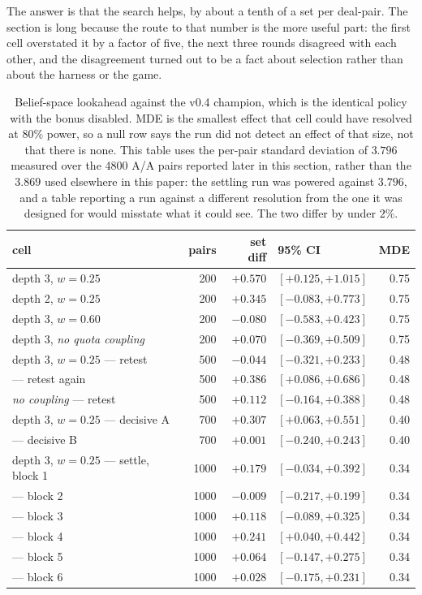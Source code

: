 \documentclass[11pt,a4paper]{article}
\begin{document}
The answer is that the search helps, by about a tenth of a set per deal-pair.
The section is long because the route to that number is the more useful part:
the first cell overstated it by a factor of five, the next three rounds
disagreed with each other, and the disagreement turned out to be a fact about
selection rather than about the harness or the game.

\begin{table}[t]
\centering
\small
\begin{tabular}{lrrlr}
\toprule
cell & pairs & set diff & 95\% CI & MDE \\
\midrule
depth 3, $w=0.25$ & 200 & $\mathbf{+0.570}$ & $[+0.125, +1.015]$ & 0.75 \\
depth 2, $w=0.25$ & 200 & $+0.345$ & $[-0.083, +0.773]$ & 0.75 \\
depth 3, $w=0.60$ & 200 & $-0.080$ & $[-0.583, +0.423]$ & 0.75 \\
depth 3, \emph{no quota coupling} & 200 & $+0.070$ & $[-0.369, +0.509]$ & 0.75 \\
\midrule
depth 3, $w=0.25$ --- retest & 500 & $-0.044$ & $[-0.321, +0.233]$ & 0.48 \\
\midrule
\quad --- retest again & 500 & $\mathbf{+0.386}$ & $[+0.086, +0.686]$ & 0.48 \\
\midrule
\emph{no coupling} --- retest & 500 & $+0.112$ & $[-0.164, +0.388]$ & 0.48 \\
\midrule
depth 3, $w=0.25$ --- decisive A & 700 & $\mathbf{+0.307}$ & $[+0.063, +0.551]$ & 0.40 \\
\midrule
\quad --- decisive B & 700 & $+0.001$ & $[-0.240, +0.243]$ & 0.40 \\
depth 3, $w=0.25$ --- settle, block 1 & 1000 & $+0.179$ & $[-0.034, +0.392]$ & 0.34 \\
\quad --- block 2 & 1000 & $-0.009$ & $[-0.217, +0.199]$ & 0.34 \\
\quad --- block 3 & 1000 & $+0.118$ & $[-0.089, +0.325]$ & 0.34 \\
\quad --- block 4 & 1000 & $\mathbf{+0.241}$ & $[+0.040, +0.442]$ & 0.34 \\
\quad --- block 5 & 1000 & $+0.064$ & $[-0.147, +0.275]$ & 0.34 \\
\quad --- block 6 & 1000 & $+0.028$ & $[-0.175, +0.231]$ & 0.34 \\
\bottomrule
\end{tabular}
\caption{Belief-space lookahead against the v0.4 champion, which is the identical policy with the bonus disabled. MDE is the smallest effect that cell could have resolved at 80\% power, so a null row says the run did not detect an effect of that size, not that there is none. This table uses the per-pair standard deviation of $3.796$ measured over the 4800 A/A pairs reported later in this section, rather than the $3.869$ used elsewhere in this paper: the settling run was powered against $3.796$, and a table reporting a run against a different resolution from the one it was designed for would misstate what it could see. The two differ by under $2\%$.}
\label{tab:lookahead}
\end{table}
\end{document}
